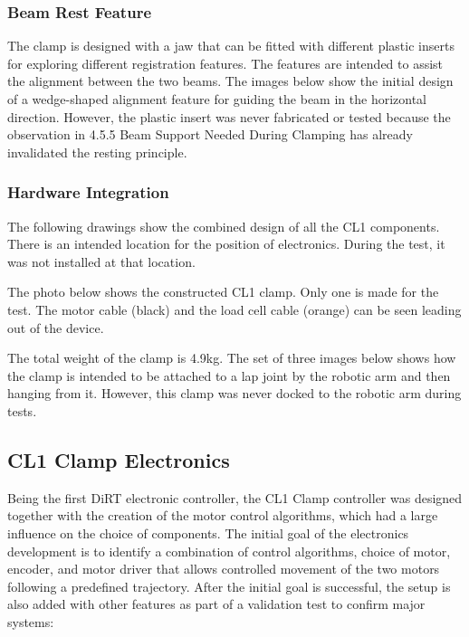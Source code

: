 \subsubsection{Beam Rest Feature}
\label{subsubsection:exploration-1-beam-rest-feature}

The clamp is designed with a jaw that can be fitted with different plastic inserts for exploring different registration features. The features are intended to assist the alignment between the two beams. The images below show the initial design of a wedge-shaped alignment feature for guiding the beam in the horizontal direction. However, the plastic insert was never fabricated or tested because the observation in 4.5.5 Beam Support Needed During Clamping has already invalidated the resting principle.

\subsubsection{Hardware Integration}
\label{subsubsection:exploration-1-hardware-integration}

The following drawings show the combined design of all the CL1 components. There is an intended location for the position of electronics. During the test, it was not installed at that location.


The photo below shows the constructed CL1 clamp. Only one is made for the test. The motor cable (black) and the load cell cable (orange) can be seen leading out of the device.

The total weight of the clamp is 4.9kg.
The set of three images below shows how the clamp is intended to be attached to a lap joint by the robotic arm and then hanging from it. However, this clamp was never docked to the robotic arm during tests.


\subsection{CL1 Clamp Electronics}
\label{subsection:exploration-1-cl1-clamp-electronics}

Being the first DiRT electronic controller, the CL1 Clamp controller was designed together with the creation of the motor control algorithms, which had a large influence on the choice of components. The initial goal of the electronics development is to identify a combination of control algorithms, choice of motor, encoder, and motor driver that allows controlled movement of the two motors following a predefined trajectory.
After the initial goal is successful, the setup is also added with other features as part of a validation test to confirm major systems:

